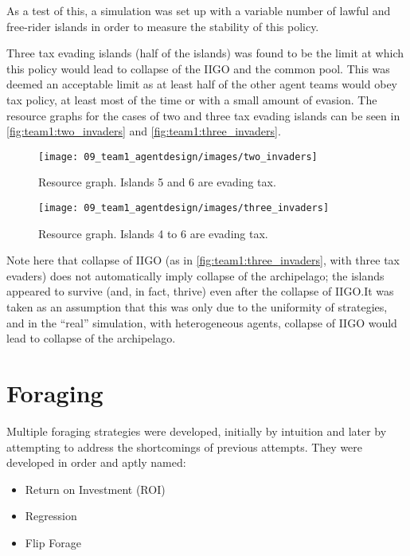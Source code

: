 As a test of this, a simulation was set up with a variable number of lawful and free-rider islands in order to measure the stability of this policy.

Three tax evading islands (half of the islands) was found to be the limit at which this policy would lead to collapse of the IIGO and the common pool. This was deemed an acceptable limit as at least half of the other agent teams would obey tax policy, at least most of the time or with a small amount of evasion. The resource graphs for the cases of two and three tax evading islands can be seen in \autoref{fig:team1:two_invaders} and \autoref{fig:team1:three_invaders}.

\begin{figure}[H]
\centering
\texttt{[image: 09\_team1\_agentdesign/images/two\_invaders]}
\caption{Resource graph. Islands 5 and 6 are evading tax.}
\label{fig:team1:two_invaders}
\end{figure}

\begin{figure}[H]
\centering
\texttt{[image: 09\_team1\_agentdesign/images/three\_invaders]}
\caption{Resource graph. Islands 4 to 6 are evading tax.}
\label{fig:team1:three_invaders}
\end{figure}

Note here that collapse of IIGO (as in \autoref{fig:team1:three_invaders}, with three tax evaders) does not automatically imply collapse of the archipelago; the islands appeared to survive (and, in fact, thrive) even after the collapse of IIGO.\@ It was taken as an assumption that this was only due to the uniformity of strategies, and in the ``real'' simulation, with heterogeneous agents, collapse of IIGO would lead to collapse of the archipelago.



\section{Foraging}
Multiple foraging strategies were developed, initially by intuition and later by attempting to address the shortcomings of previous attempts. They were developed in order and aptly named:
\begin{itemize}
    \item Return on Investment (ROI)
    \item Regression
    \item Flip Forage
\end{itemize}


